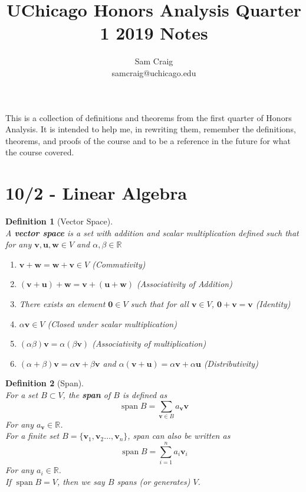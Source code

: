 \documentclass[12pt]{article}
\title{UChicago Honors Analysis Quarter 1 2019 Notes}
\author{Sam Craig\\samcraig@uchicago.edu}
\theoremstyle{plain}
\newtheorem{definition}{Definition}[section]
\newcommand{\R}{\mathbb{R}}
\DeclareMathOperator{\spn}{span}
\newcommand{\vv}{\mathbf{v}}
\newcommand{\vu}{\mathbf{u}}
\newcommand{\vw}{\mathbf{w}}
\newcommand{\vzero}{\mathbf{0}}
\begin{document}
    \maketitle

    This is a collection of definitions and theorems from the first quarter of Honors Analysis. It is intended to help me, in rewriting them, remember the definitions, theorems, and proofs of the course and to be a reference in the future for what the course covered.

    \section[d1]{10/2 - Linear Algebra}

    \begin{definition}[Vector Space]
        ~\\A \textbf{vector space} is a set with addition and scalar multiplication defined such that for any $\vv, \vu, \vw \in V$ and $\alpha, \beta \in \R$

        \begin{enumerate}
            \item $\vv + \vw = \vw + \vv \in V$ (Commutivity)
            \item $(\vv + \vu) + \vw = \vv + (\vu + \vw)$ (Associativity of Addition)
            \item There exists an element $\vzero \in V$ such that for all $\vv \in V$, $\vzero + \vv = \vv$ (Identity)
            \item $\alpha \vv \in V$ (Closed under scalar multiplication)
            \item $(\alpha \beta) \vv = \alpha (\beta \vv)$ (Associativity of multiplication)
            \item $(\alpha + \beta) \vv = \alpha \vv + \beta \vv$ and $\alpha (\vv + \vu) = \alpha \vv + \alpha \vu$ (Distributivity)
        \end{enumerate}
    \end{definition}

    \begin{definition}[Span]
        ~\\For a set $B \subset V$, the \textbf{span} of $B$ is defined as $$\spn B = \sum_{\vv \in B} a_{\vv} \vv$$For any $a_{\vv} \in \R$.\\For a finite set $B = \{\vv_1, \vv_2 \dots, \vv_n\}$, span can also be written as
        $$\spn B = \sum_{i = 1}^n a_i\vv_i$$For any $a_i \in \R$.\\
        If $\spn B = V$, then we say $B$ spans (or generates) $V$.
    \end{definition}
\end{document}
